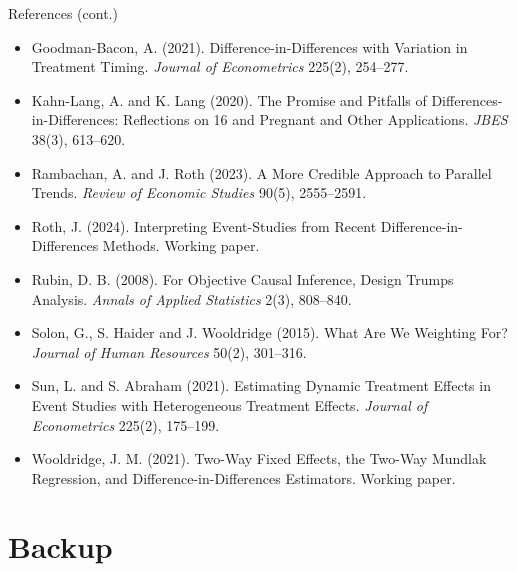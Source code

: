 \documentclass[
  11pt,
  ignorenonframetext,
  aspectratio=169,
]{beamer}
\providecommand{\tightlist}{%
  \setlength{\itemsep}{0pt}\setlength{\parskip}{0pt}}
\begin{document}
\begin{frame}{References (cont.)}
\protect{}\label{references-cont.}
\tiny

\begin{itemize}
\tightlist
\item
  Goodman-Bacon, A. (2021). Difference-in-Differences with Variation in
  Treatment Timing. \emph{Journal of Econometrics} 225(2), 254--277.
\item
  Kahn-Lang, A. and K. Lang (2020). The Promise and Pitfalls of
  Differences-in-Differences: Reflections on 16 and Pregnant and Other
  Applications. \emph{JBES} 38(3), 613--620.
\item
  Rambachan, A. and J. Roth (2023). A More Credible Approach to Parallel
  Trends. \emph{Review of Economic Studies} 90(5), 2555--2591.
\item
  Roth, J. (2024). Interpreting Event-Studies from Recent
  Difference-in-Differences Methods. Working paper.
\item
  Rubin, D. B. (2008). For Objective Causal Inference, Design Trumps
  Analysis. \emph{Annals of Applied Statistics} 2(3), 808--840.
\item
  Solon, G., S. Haider and J. Wooldridge (2015). What Are We Weighting
  For? \emph{Journal of Human Resources} 50(2), 301--316.
\item
  Sun, L. and S. Abraham (2021). Estimating Dynamic Treatment Effects in
  Event Studies with Heterogeneous Treatment Effects. \emph{Journal of
  Econometrics} 225(2), 175--199.
\item
  Wooldridge, J. M. (2021). Two-Way Fixed Effects, the Two-Way Mundlak
  Regression, and Difference-in-Differences Estimators. Working paper.
\end{itemize}
\end{frame}

\section{Backup}\label{backup}
\end{document}

